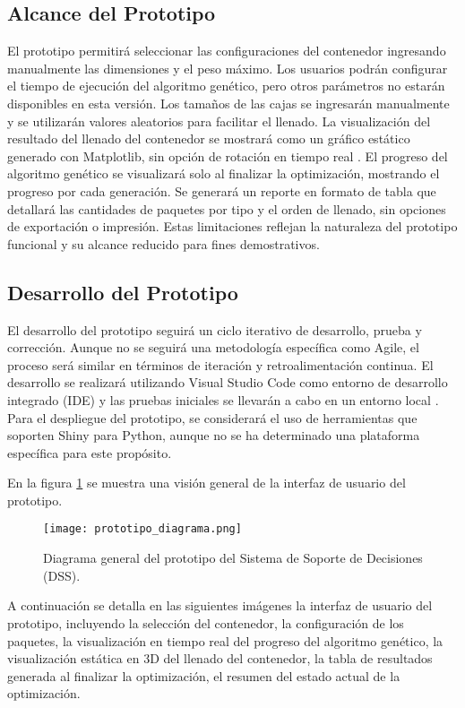 \documentclass[9pt,a4paper]{rho}
\begin{document}
\subsection{Alcance del Prototipo}
El prototipo permitirá seleccionar las configuraciones del contenedor ingresando manualmente las dimensiones y el peso máximo. Los usuarios podrán configurar el tiempo de ejecución del algoritmo genético, pero otros parámetros no estarán disponibles en esta versión. Los tamaños de las cajas se ingresarán manualmente y se utilizarán valores aleatorios para facilitar el llenado. La visualización del resultado del llenado del contenedor se mostrará como un gráfico estático generado con Matplotlib, sin opción de rotación en tiempo real . El progreso del algoritmo genético se visualizará solo al finalizar la optimización, mostrando el progreso por cada generación. Se generará un reporte en formato de tabla que detallará las cantidades de paquetes por tipo y el orden de llenado, sin opciones de exportación o impresión. Estas limitaciones reflejan la naturaleza del prototipo funcional y su alcance reducido para fines demostrativos.

\subsection{Desarrollo del Prototipo}
El desarrollo del prototipo seguirá un ciclo iterativo de desarrollo, prueba y corrección. Aunque no se seguirá una metodología específica como Agile, el proceso será similar en términos de iteración y retroalimentación continua. El desarrollo se realizará utilizando Visual Studio Code como entorno de desarrollo integrado (IDE) y las pruebas iniciales se llevarán a cabo en un entorno local \cite{vscode-intro}. Para el despliegue del prototipo, se considerará el uso de herramientas que soporten Shiny para Python, aunque no se ha determinado una plataforma específica para este propósito.

En la figura \ref{fig:prototipo_diagrama} se muestra una visión general de la interfaz de usuario del prototipo.

\begin{figure}[h!]
    \centering
    \texttt{[image: prototipo\_diagrama.png]}
    \caption{Diagrama general del prototipo del Sistema de Soporte de Decisiones (DSS).}
    \label{fig:prototipo_diagrama}
\end{figure}

A continuación se detalla en las siguientes imágenes la interfaz de usuario del prototipo, incluyendo la selección del contenedor, la configuración de los paquetes, la visualización en tiempo real del progreso del algoritmo genético, la visualización estática en 3D del llenado del contenedor, la tabla de resultados generada al finalizar la optimización, el resumen del estado actual de la optimización.
\end{document}
